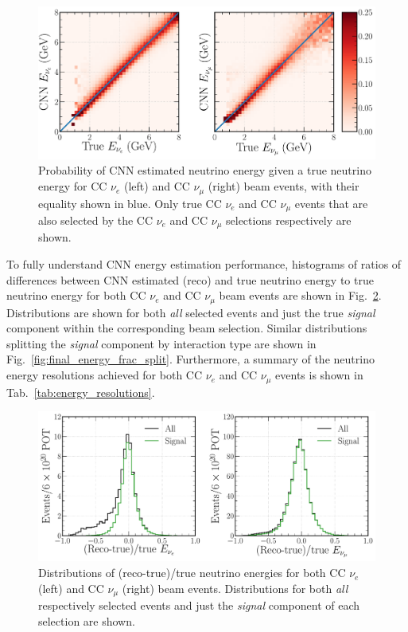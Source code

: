 \begin{figure} %
    \includegraphics[width=\textwidth]{diagrams/7-results/final_energy_2d.pdf}
    \caption[Probability of CNN estimated neutrino energy given a true neutrino energy]
    {Probability of CNN estimated neutrino energy given a true neutrino energy for CC $\nu_{e}$
        (left) and CC $\nu_{\mu}$ (right) beam events, with their equality shown in blue. Only
        true CC $\nu_{e}$ and CC $\nu_{\mu}$ events that are also selected by the CC $\nu_{e}$ and
        CC $\nu_{\mu}$ selections respectively are shown.}
    \label{fig:final_energy_2d}
\end{figure}

To fully understand CNN energy estimation performance, histograms of ratios of differences between
CNN estimated (reco) and true neutrino energy to true neutrino energy for both CC $\nu_{e}$ and CC
$\nu_{\mu}$ beam events are shown in Fig.~\ref{fig:final_energy_frac}. Distributions are shown for
both \emph{all} selected events and just the true \emph{signal} component within the corresponding
beam selection. Similar distributions splitting the \emph{signal} component by interaction type
are shown in Fig.~\ref{fig:final_energy_frac_split}. Furthermore, a summary of the neutrino energy
resolutions achieved for both CC $\nu_{e}$ and CC $\nu_{\mu}$ events is shown in
Tab.~\ref{tab:energy_resolutions}.

\begin{figure} %
    \includegraphics[width=\textwidth]{diagrams/7-results/final_energy_frac.pdf}
    \caption[Distributions of (reco-true)/true neutrino energies]
    {Distributions of (reco-true)/true neutrino energies for both CC $\nu_{e}$ (left) and CC
        $\nu_{\mu}$ (right) beam events. Distributions for both \emph{all} respectively selected
        events and just the \emph{signal} component of each selection are shown.}
    \label{fig:final_energy_frac}
\end{figure}

